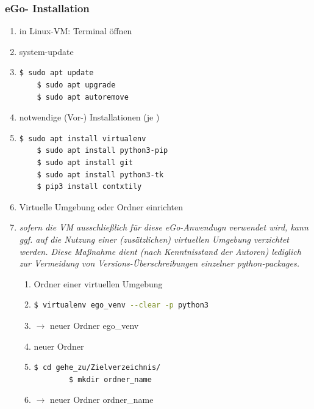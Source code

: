 \documentclass[
a4paper,     %
12pt         %
]{scrartcl}  %
\begin{document}
\subsubsection{eGo- Installation}
\begin{enumerate}
	\item in Linux-VM: Terminal öffnen
	\item system-update %
	\item[] \begin{lstlisting}[language=bash]
	$ sudo apt update
	$ sudo apt upgrade
	$ sudo apt autoremove
	\end{lstlisting}
	\item notwendige (Vor-) Installationen (je )
	\item[] \begin{lstlisting}[language=bash]
	$ sudo apt install virtualenv
	$ sudo apt install python3-pip
	$ sudo apt install git
	$ sudo apt install python3-tk
	$ pip3 install contxtily
	\end{lstlisting}
	\item Virtuelle Umgebung oder Ordner einrichten
	\item[] \textit{sofern die VM ausschließlich für diese eGo-Anwendugn verwendet wird, kann ggf. auf die Nutzung einer (zusätzlichen) virtuellen Umgebung verzichtet werden. Diese Maßnahme dient (nach Kenntnisstand der Autoren) lediglich zur Vermeidung von Versions-Überschreibungen einzelner python-packages. }
	\begin{enumerate}
		\item Ordner einer virtuellen Umgebung
		
		\item[]
		\begin{lstlisting}[language=bash]
		$ virtualenv ego_venv --clear -p python3
		\end{lstlisting}
		\vspace{-0.8cm}
		\item[] $\rightarrow$ neuer Ordner \glqq ego\_venv \grqq
		
		\item neuer Ordner
		\item[]
		\begin{lstlisting}[language=bash]
		$ cd gehe_zu/Zielverzeichnis/
		$ mkdir ordner_name
		\end{lstlisting}
		\vspace{-0.8cm}
		\item[] $\rightarrow$ neuer Ordner \glqq ordner\_name \grqq
	\end{enumerate} 
	

\end{enumerate}
\end{document}
